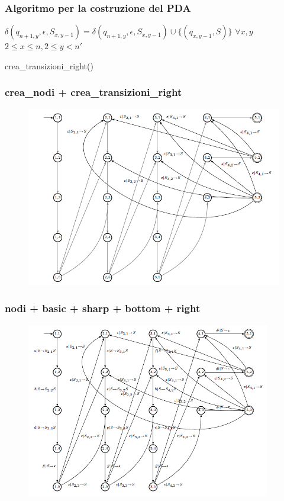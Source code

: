 \documentclass{beamer}
\begin{document}
\begin{frame}
\frametitle{Algoritmo per la costruzione del PDA}
\begin{algorithm}[H]
\begin{algorithmic}[1]
	\STATE $\delta(q_{n+1,y},\epsilon,S_{x,y-1}) = \delta(q_{n+1,y},\epsilon,S_{x,y-1}) \cup \{(q_{x,y-1},S)\}$
	\STATE  $\forall x,y$ $2 \leq x \leq n, 2\leq y < n'$
\end{algorithmic}
\caption{crea\_transizioni\_right()}
\end{algorithm}
\end{frame}


\begin{frame}
\frametitle{crea\_nodi + crea\_transizioni\_right}
\begin{figure}[p]
    \includegraphics[width=1\textwidth]{pda_3.png}
\end{figure}
\end{frame}

\begin{frame}
\frametitle{nodi + basic + sharp + bottom + right}
\begin{figure}[p]
\vspace*{-0.35cm}
    \includegraphics[width=0.95\textwidth]{pda_4.png}
\end{figure}
\end{frame}
\end{document}

